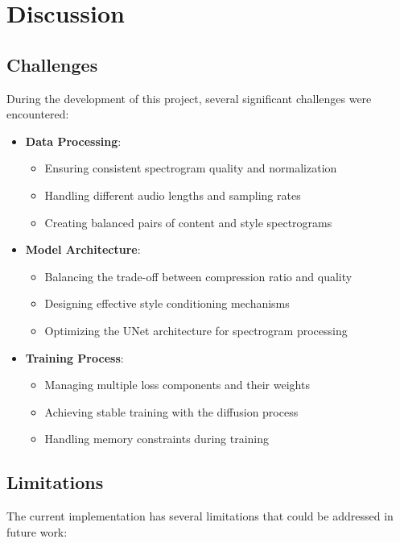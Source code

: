 \section{Discussion}

\subsection{Challenges}
During the development of this project, several significant challenges were encountered:

\begin{itemize}
    \item \textbf{Data Processing}:
    \begin{itemize}
        \item Ensuring consistent spectrogram quality and normalization
        \item Handling different audio lengths and sampling rates
        \item Creating balanced pairs of content and style spectrograms
    \end{itemize}
    
    \item \textbf{Model Architecture}:
    \begin{itemize}
        \item Balancing the trade-off between compression ratio and quality
        \item Designing effective style conditioning mechanisms
        \item Optimizing the UNet architecture for spectrogram processing
    \end{itemize}
    
    \item \textbf{Training Process}:
    \begin{itemize}
        \item Managing multiple loss components and their weights
        \item Achieving stable training with the diffusion process
        \item Handling memory constraints during training
    \end{itemize}
\end{itemize}

\subsection{Limitations}
The current implementation has several limitations that could be addressed in future work:

